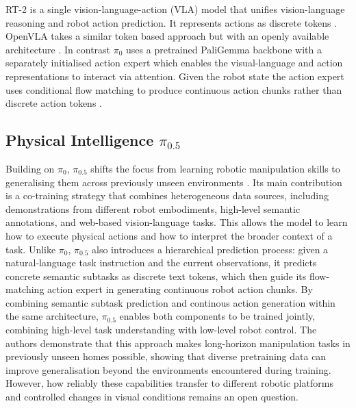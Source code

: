 \documentclass[10pt,twocolumn,letterpaper]{article}
\begin{document}
RT-2 is a single vision-language-action (VLA) model that unifies vision-language reasoning and robot action prediction. It represents actions as discrete tokens \cite{zitkovich2023rt2}. OpenVLA takes a similar token based approach but with an openly available architecture \cite{kim2025openvla}. In contrast $\pi_0$ uses a pretrained PaliGemma backbone with a separately initialised action expert which enables the visual-language and action representations to interact via attention. Given the robot state the action expert uses conditional flow matching to produce continuous action chunks rather than discrete action tokens \cite{black2024pi0}.

\subsection{Physical Intelligence $\pi_{0.5}$}
Building on $\pi_{0}$, $\pi_{0.5}$ shifts the focus from learning robotic manipulation skills to generalising them across previously unseen environments \cite{black2025pi05}. Its main contribution is a co-training strategy that combines heterogeneous data sources, including demonstrations from different robot embodiments, high-level semantic annotations, and web-based vision-language tasks. This allows the model to learn how to execute physical actions and how to interpret the broader context of a task. Unlike $\pi_{0}$, $\pi_{0.5}$ also introduces a hierarchical prediction process: given a natural-language task instruction and the current observations, it predicts concrete semantic subtasks as discrete text tokens, which then guide its flow-matching action expert in generating continuous robot action chunks. By combining semantic subtask prediction and continous action generation within the same architecture, $\pi_{0.5}$ enables both components to be trained jointly, combining high-level task understanding with low-level robot control. The authors demonstrate that this approach makes long-horizon manipulation tasks in previously unseen homes possible, showing that diverse pretraining data can improve generalisation beyond the environments encountered during training. However, how reliably these capabilities transfer to different robotic platforms and controlled changes in visual conditions remains an open question.
\end{document}
